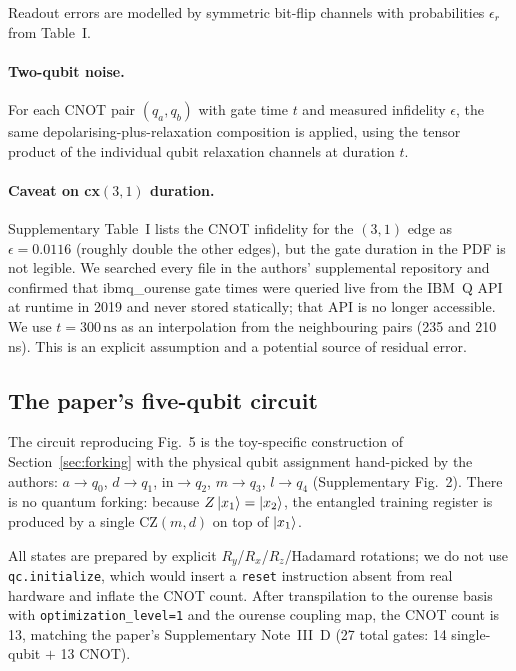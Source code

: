 \documentclass[11pt,a4paper]{article}
\begin{document}
Readout errors are modelled by symmetric bit-flip channels with
probabilities $\epsilon_r$ from Table~I.

\paragraph{Two-qubit noise.} For each CNOT pair $(q_a, q_b)$ with gate
time $t$ and measured infidelity $\epsilon$, the same depolarising-plus-relaxation
composition is applied, using the tensor product of the individual qubit
relaxation channels at duration $t$.

\paragraph{Caveat on cx$(3,1)$ duration.} Supplementary Table~I lists the
CNOT infidelity for the $(3,1)$ edge as $\epsilon = 0.0116$ (roughly double
the other edges), but the gate duration in the PDF is not legible. We searched
every file in the authors' supplemental repository
\cite{blank2020supplemental} and confirmed that ibmq\_ourense gate times were
queried live from the IBM~Q API at runtime in 2019 and never stored statically;
that API is no longer accessible. We use $t = 300\,\mathrm{ns}$ as an
interpolation from the neighbouring pairs (235 and 210\,ns). This is an
explicit assumption and a potential source of residual error.

\subsection{The paper's five-qubit circuit}

The circuit reproducing Fig.~5 is the toy-specific construction of
Section~\ref{sec:forking} with the physical qubit assignment hand-picked by
the authors: $a \to q_0$, $d \to q_1$, $\mathrm{in} \to q_2$,
$m \to q_3$, $l \to q_4$ (Supplementary Fig.~2). There is no quantum
forking: because $Z\ket{x_1} = \ket{x_2}$, the entangled training register
is produced by a single $\mathrm{CZ}(m, d)$ on top of $\ket{x_1}$.

All states are prepared by explicit $R_y$/$R_x$/$R_z$/Hadamard rotations;
we do not use \texttt{qc.initialize}, which would insert a \texttt{reset}
instruction absent from real hardware and inflate the CNOT count. After
transpilation to the ourense basis with \texttt{optimization\_level=1} and
the ourense coupling map, the CNOT count is 13, matching the paper's
Supplementary Note~III~D (27 total gates: 14 single-qubit $+ $ 13 CNOT).
\end{document}
